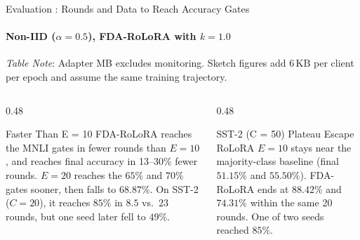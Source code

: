 \documentclass[aspectratio=169]{beamer}
\begin{document}
\begin{frame}{Evaluation : Rounds and Data to Reach Accuracy Gates}
    \framesubtitle{Non-IID ($\alpha = 0.5$), FDA-RoLoRA with $k = 1.0$}
    \vspace{-0.4em}
    \centering
    
    \vspace{0.2em}
    {\tiny \textit{Table Note}: Adapter MB excludes monitoring. Sketch figures add $6\,\text{KB}$ per client per epoch and assume the same training trajectory.}
    
    \vspace{0.35em}
    \begin{columns}[t]
        \begin{column}{0.48\textwidth}
            \begin{exampleblock}{Faster Than E = 10}
                \scriptsize
                FDA-RoLoRA reaches the MNLI gates in fewer rounds than $E = 10$, and reaches final accuracy in 13--30\% fewer rounds. $E = 20$ reaches the $65\%$ and $70\%$ gates sooner, then falls to $68.87\%$. On SST-2 ($C = 20$), it reaches $85\%$ in $8.5$ vs.\ $23$ rounds, but one seed later fell to $49\%$.
            \end{exampleblock}
        \end{column}
        \begin{column}{0.48\textwidth}
            \begin{exampleblock}{SST-2 (C = 50) Plateau Escape}
                \scriptsize
                RoLoRA $E = 10$ stays near the majority-class baseline (final $51.15\%$ and $55.50\%$). FDA-RoLoRA ends at $88.42\%$ and $74.31\%$ within the same 20 rounds. One of two seeds reached $85\%$.
            \end{exampleblock}
        \end{column}
    \end{columns}
\end{frame}
\end{document}
